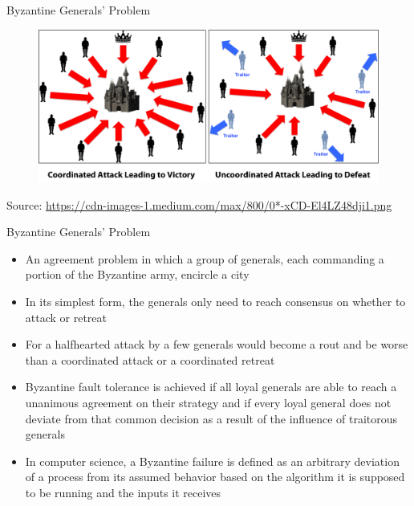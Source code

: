 \documentclass[10pt]{beamer}
\begin{document}

\begin{frame}{Byzantine Generals' Problem}
	\begin{figure}[]
		\centering
		\includegraphics  [width=4.in]{Images/byzantine}
	\end{figure}
	\begin{tiny}
		Source: \href{https://cdn-images-1.medium.com/max/800/0*-xCD-El4LZ48dji1.png}{https://cdn-images-1.medium.com/max/800/0*-xCD-El4LZ48dji1.png}
	\end{tiny}
\end{frame}



\begin{frame}{Byzantine Generals' Problem}
	\begin{itemize}
		\item An agreement problem in which a group of generals, each commanding a portion of the Byzantine army, encircle a city
		\item In its simplest form, the generals only need to reach consensus on whether to attack or retreat
		\item For a halfhearted attack by a few generals would become a rout and be worse than a coordinated attack or a coordinated retreat
		\item Byzantine fault tolerance is achieved if all loyal generals are able to reach a unanimous agreement on their strategy and if every loyal general does not deviate from that common decision as a result of the influence of traitorous generals
		\item In computer science, a Byzantine failure is defined as an arbitrary deviation of a process from its assumed behavior based on the algorithm it is supposed to be running and the inputs it receives
	\end{itemize}
\end{frame}


\end{document}
